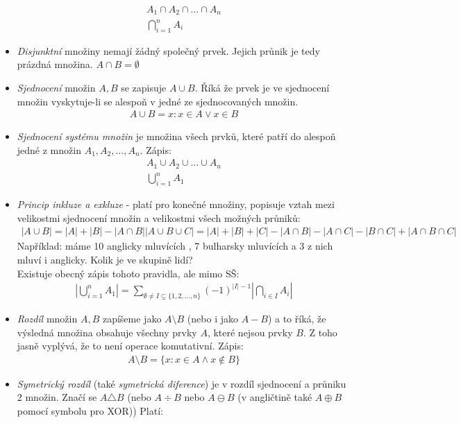 \documentclass[12pt]{article}
\begin{document}
\begin{itemize}
\begin{align}
A_1 \cap A_2 \cap \dotso \cap A_n \\
\bigcap_{i=1}^n A_i
\end{align}
\item \emph{Disjunktní} množiny nemají žádný společný prvek. Jejich průnik je tedy prázdná množina. $ A \cap B = \emptyset$
\item \emph{Sjednocení} množin $A,B$ se zapisuje $A \cup B$. Říká že prvek je ve sjednocení množin vyskytuje-li se alespoň v jedné ze sjednocovaných množin.
\begin{align}
A \cup B = {x: x \in A \lor x \in B}
\end{align}
\item \emph{Sjednocení systému množin} je množina všech prvků, které patří do alespoň jedné z množin $A_1, A_2, \dotsc , A_n$. Zápis:
\begin{align}
A_1 \cup A_2 \cup \dotso \cup  A_n \\
\bigcup_{i=1}^{n} A_1
\end{align}
\item \emph{Princip inkluze a exkluze} - platí pro konečné množiny, popisuje vztah mezi velikostmi sjednocení množin a velikostmi všech možných průniků:
\begin{align}
|A \cup B| = |A| + |B| - |A \cap B|
|A \cup B \cup C| = |A| + |B| + |C| - |A \cap B| - |A \cap C| - |B \cap C| + |A \cap B \cap C|
\end{align}
Například: máme 10 anglicky mluvících , 7 bulharsky mluvících a 3 z nich mluví i anglicky. Kolik je ve skupině lidí?\\
Existuje obecný zápis tohoto pravidla, ale mimo SŠ:
\begin{align}
\left| \bigcup_{i=1}^n A_1  \right| = \sum_{\emptyset \neq I \subseteq \{ 1,2, \dotsc , n\} } \left(-1 \right)^{|I|-1} \left| \bigcap_{i \in I} A_i \right|
\end{align}
\item \emph{Rozdíl} množin $A,B$ zapíšeme jako $A \setminus B$ (nebo i jako $A -B$) a to říká, že výsledná množina obsahuje všechny prvky $A$, které nejsou prvky $B$. Z toho jasně vyplývá, že to není operace komutativní. Zápis:
\begin{align}
A \setminus B= \{ x: x \in A \land x \notin B \}
\end{align}
\item \emph{Symetrický rozdíl} (také \emph{symetrická diference}) je v rozdíl sjednocení a průniku 2 množin.  Značí se $A \triangle B$ (nebo $A \div B$ nebo $A \ominus B$ (v angličtině také $ A \oplus B$ pomocí symbolu pro XOR)) Platí:

\end{itemize}
\end{document}
